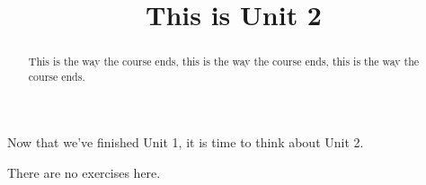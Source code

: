\documentclass{ximera}
\title{This is Unit 2}
\begin{document}
\begin{abstract}
  This is the way the course ends, this is the way the course ends, this is the way the course ends.
\end{abstract}

Now that we've finished Unit 1, it is time to think about Unit 2.


There are no exercises here.
\end{document}
